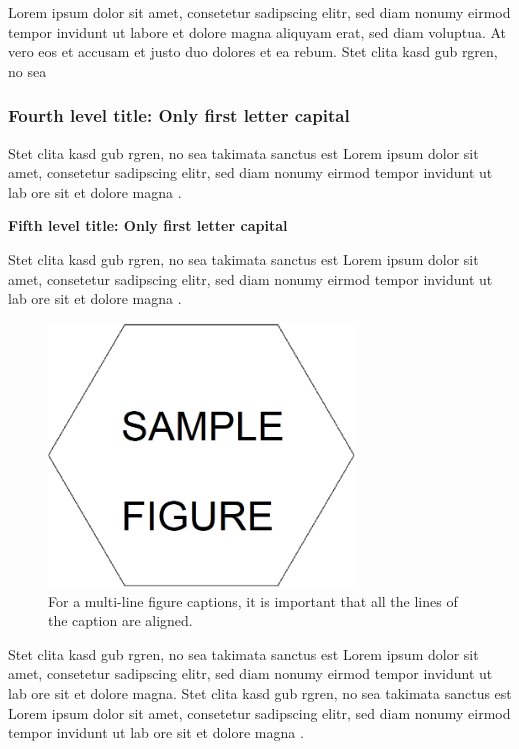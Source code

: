\textcite{Wolchik2000843} Lorem ipsum dolor sit amet, consetetur sadipscing elitr, sed diam nonumy eirmod tempor invidunt ut labore et dolore magna aliquyam erat, sed diam voluptua. At vero eos et accusam et justo duo dolores et ea rebum. Stet clita kasd gub rgren, no sea 

\subsubsection{Fourth level title: Only first letter capital}

\textcite{Box:1990:TSA:574978} Stet clita kasd gub rgren, no sea takimata sanctus est Lorem ipsum dolor sit amet, consetetur sadipscing elitr, sed diam nonumy eirmod tempor invidunt ut lab ore sit et dolore magna \parencite{HYP:HYP57}.

\textbf{Fifth level title: Only first letter capital}

Stet clita kasd gub rgren, no sea takimata sanctus est Lorem ipsum dolor sit amet, consetetur sadipscing elitr, sed diam nonumy eirmod tempor invidunt ut lab ore sit et dolore magna \parencite{url-1,url-2}.

\vspace{6pt} %
\begin{figure}[!ht]
 \centering
 \includegraphics[width=230pt,keepaspectratio=true]{./fig/sekil6.png}
 \caption{For a multi-line figure captions, it is important that all the
  lines of the caption are aligned.}
 \label{fig:ch4-1}
\end{figure}
\vspace{-6pt} %

\cite{TS-40561} Stet clita kasd gub rgren, no sea takimata sanctus est Lorem ipsum dolor sit amet, consetetur sadipscing elitr, sed diam nonumy eirmod tempor invidunt ut lab ore sit et dolore magna. Stet clita kasd gub rgren, no sea takimata sanctus est Lorem ipsum dolor sit amet, consetetur sadipscing elitr, sed diam nonumy eirmod tempor invidunt ut lab ore sit et dolore magna \cite{startrek,simpsondvd}. 

